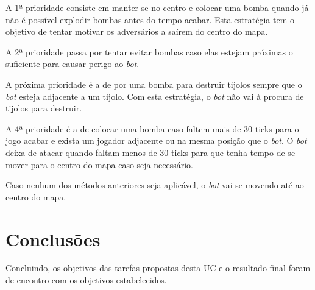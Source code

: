 \documentclass[a4paper]{article}
\begin{document}
A 1ª prioridade consiste em manter-se no centro e colocar uma bomba quando
já não é possível explodir bombas antes do tempo acabar. Esta estratégia tem
o objetivo de tentar motivar os adversários a saírem do centro do mapa.

A 2ª prioridade passa por tentar evitar bombas caso elas estejam próximas o
suficiente para causar perigo ao \textit{bot}.

A próxima prioridade é a de por uma bomba para destruir tijolos sempre que o \textit{bot}
esteja adjacente a um tijolo. Com esta estratégia, o \textit{bot} não vai à procura de
tijolos para destruir.

A 4ª prioridade é a de colocar uma bomba caso faltem mais de 30 ticks para o jogo
acabar e exista um jogador adjacente ou na mesma posição que o \textit{bot}. O \textit{bot} deixa de
atacar quando faltam menos de 30 ticks para que tenha tempo de se mover para o
centro do mapa caso seja necessário.

Caso nenhum dos métodos anteriores seja aplicável, o \textit{bot} vai-se movendo até
ao centro do mapa.


\section{Conclusões}
\label{sec:conclusao}

Concluindo, os objetivos das tarefas propostas desta UC e o resultado final foram
de encontro com os objetivos estabelecidos.
\end{document}
